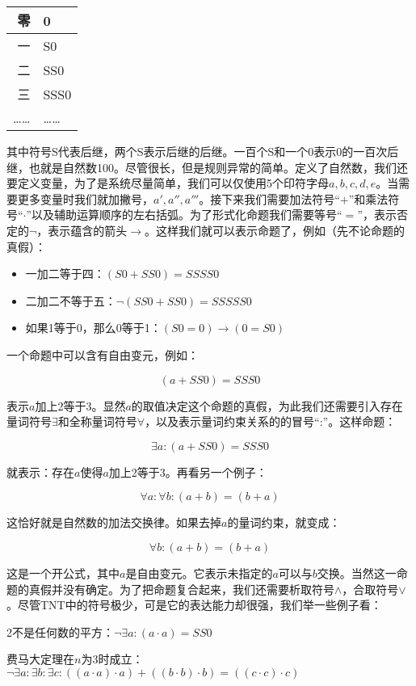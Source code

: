 \documentclass{article}
\begin{document}
\begin{tabular}{|r|l|}
零 & 0 \\
\hline
一 & S0 \\
\hline
二 & SS0 \\
\hline
三 & SSS0 \\
\hline
…… & …… \\
\end{tabular}

其中符号S代表后继，两个S表示后继的后继。一百个S和一个0表示0的一百次后继，也就是自然数100。尽管很长，但是规则异常的简单。定义了自然数，我们还要定义变量，为了是系统尽量简单，我们可以仅使用5个印符字母$a, b, c, d, e$。当需要更多变量时我们就加撇号，$a', a'', a'''$。接下来我们需要加法符号“$+$”和乘法符号“$\cdot$”以及辅助运算顺序的左右括弧。为了形式化命题我们需要等号“$=$”，表示否定的$\lnot$，表示蕴含的箭头$\to$。这样我们就可以表示命题了，例如（先不论命题的真假）：

\begin{itemize}
\item 一加二等于四：$(S0 + SS0) = SSSS0$
\item 二加二不等于五：$\lnot (SS0 + SS0) = SSSSS0$
\item 如果1等于0，那么0等于1：$(S0 = 0) \to (0 = S0)$
\end{itemize}

一个命题中可以含有自由变元，例如：

\[
(a + SS0) = SSS0
\]

表示$a$加上2等于3。显然$a$的取值决定这个命题的真假，为此我们还需要引入存在量词符号$\exists$和全称量词符号$\forall$，以及表示量词约束关系的的冒号“:”。这样命题：

\[
\exists a : (a + SS0) = SSS0
\]

就表示：存在$a$使得$a$加上2等于3。再看另一个例子：

\[
\forall a : \forall b : (a + b) = (b + a)
\]

这恰好就是自然数的加法交换律。如果去掉$a$的量词约束，就变成：

\[
\forall b : (a + b) = (b + a)
\]

这是一个开公式，其中$a$是自由变元。它表示未指定的$a$可以与$b$交换。当然这一命题的真假并没有确定。为了把命题复合起来，我们还需要析取符号$\land$，合取符号$\lor$。尽管TNT中的符号极少，可是它的表达能力却很强，我们举一些例子看：

2不是任何数的平方：$\lnot \exists a : (a \cdot a) = SS0$

费马大定理在$n$为3时成立：$\lnot \exists a : \exists b : \exists c : ((a \cdot a) \cdot a) + ((b \cdot b) \cdot b) = ((c \cdot c) \cdot c)$
\end{document}
